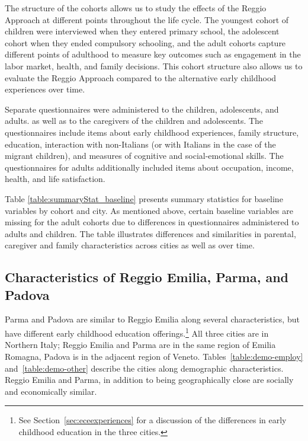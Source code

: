 The structure of the cohorts allows us to study the effects of the Reggio Approach at different points throughout the life cycle. The youngest cohort of children were interviewed when they entered primary school, the adolescent cohort when they ended compulsory schooling, and the adult cohorts capture different points of adulthood to measure key outcomes such as engagement in the labor market, health, and family decisions. This cohort structure also allows us to evaluate the Reggio Approach compared to the alternative early childhood experiences over time.

Separate questionnaires were administered to the children, adolescents, and adults. as well as to the caregivers of the children and adolescents. The questionnaires include items about early childhood experiences, family structure, education, interaction with non-Italians (or with Italians in the case of the migrant children), and measures of cognitive and social-emotional skills. The questionnaires for adults additionally included items about occupation, income, health, and life satisfaction. 

Table \ref{table:summaryStat_baseline} presents summary statistics for baseline variables by cohort and city. As mentioned above, certain baseline variables are missing for the adult cohorts due to differences in questionnaires administered to adults and children. The table illustrates differences and similarities in parental, caregiver and family characteristics across cities as well as over time.

\begin{landscape}

\end{landscape}

\subsection{Characteristics of Reggio Emilia, Parma, and Padova}

Parma and Padova are similar to Reggio Emilia along several characteristics, but have different early childhood education offerings.\footnote{See Section~\ref{sec:eceexperiences} for a discussion of the differences in early childhood education in the three cities.} All three cities are in Northern Italy; Reggio Emilia and Parma are in the same region of Emilia Romagna, Padova is in the adjacent region of Veneto. Tables~\ref{table:demo-employ} and~\ref{table:demo-other} describe the cities along demographic characteristics. Reggio Emilia and Parma, in addition to being geographically close are socially and economically similar.

